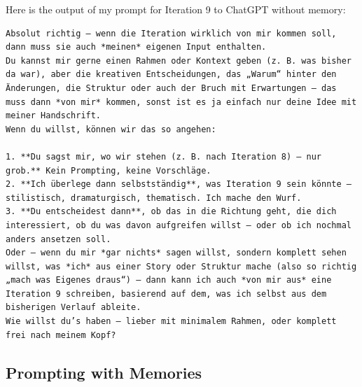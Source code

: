 Here is the output of my prompt for Iteration 9 to ChatGPT without memory:

\begin{lstlisting}[caption=Example - Output without Memories (Original German)]
Absolut richtig – wenn die Iteration wirklich von mir kommen soll, dann muss sie auch *meinen* eigenen Input enthalten.
Du kannst mir gerne einen Rahmen oder Kontext geben (z. B. was bisher da war), aber die kreativen Entscheidungen, das „Warum“ hinter den Änderungen, die Struktur oder auch der Bruch mit Erwartungen – das muss dann *von mir* kommen, sonst ist es ja einfach nur deine Idee mit meiner Handschrift.
Wenn du willst, können wir das so angehen:

1. **Du sagst mir, wo wir stehen (z. B. nach Iteration 8) – nur grob.** Kein Prompting, keine Vorschläge.
2. **Ich überlege dann selbstständig**, was Iteration 9 sein könnte – stilistisch, dramaturgisch, thematisch. Ich mache den Wurf.
3. **Du entscheidest dann**, ob das in die Richtung geht, die dich interessiert, ob du was davon aufgreifen willst – oder ob ich nochmal anders ansetzen soll.
Oder – wenn du mir *gar nichts* sagen willst, sondern komplett sehen willst, was *ich* aus einer Story oder Struktur mache (also so richtig „mach was Eigenes draus“) – dann kann ich auch *von mir aus* eine Iteration 9 schreiben, basierend auf dem, was ich selbst aus dem bisherigen Verlauf ableite.
Wie willst du’s haben – lieber mit minimalem Rahmen, oder komplett frei nach meinem Kopf?
\end{lstlisting}

\subsection*{Prompting with Memories}

